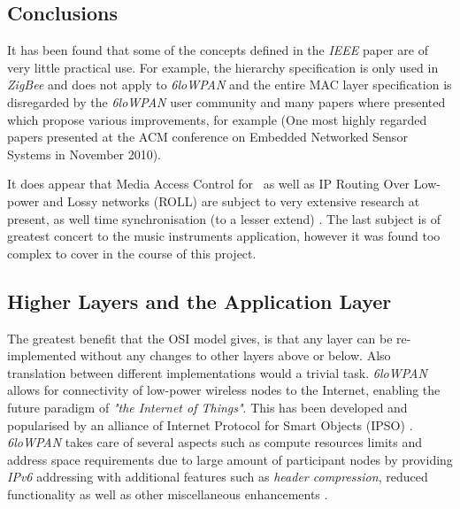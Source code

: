 \subsection{Conclusions}

  It has been found that some of the concepts defined in the \emph{IEEE}
 paper are of very little practical use. For example, the hierarchy
 specification is only used in \emph{ZigBee} and does not apply to
 \emph{6loWPAN} and the entire MAC layer specification is disregarded
 by the \emph{6loWPAN} user community and many papers where presented
 which propose various improvements, for example \cite{papers:amac}
 (One most highly regarded papers presented at the ACM conference
 on Embedded Networked Sensor Systems in November 2010).

 It does appear that Media Access Control for \WPAN\ as well as IP
 Routing Over Low-power and Lossy networks (ROLL) \cite{rfc:drafts:roll:survey07}
 are subject to very extensive research at present, as well time
 synchronisation (to a lesser extend) \cite{paper:ts1,paper:ts2,
 paper:ts3}. The last subject is of greatest concert to the music
 instruments application, however it was found too complex to cover
 in the course of this project.




\subsection{Higher Layers and the Application Layer}

  The greatest benefit that the OSI model gives, is that any layer
 can be re-implemented without any changes to other layers above or
 below. Also translation between different implementations would a
 trivial task. \emph{6loWPAN} allows for connectivity of low-power
 wireless nodes to the Internet, enabling the future paradigm of
 \emph{"the Internet of Things"}. This has been developed and
 popularised by an alliance of Internet Protocol for Smart Objects
 (IPSO) \cite{links:ipso:homepage}. \emph{6loWPAN} takes care of
 several aspects such as compute resources limits and address space
 requirements due to large amount of participant nodes by providing
 \emph{IPv6} addressing with additional features such as \emph{header
 compression}, reduced functionality as well as other miscellaneous
 enhancements \cite{pubs:ipso:wp3, pubs:ipso:wp1}.

